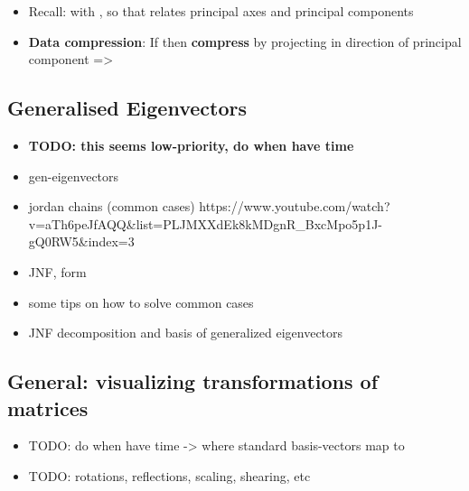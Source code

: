 \begin{itemize}
        \begin{itemize}

          \item
                Recall:
                with , so that
                relates principal axes and principal components
          \item
                \textbf{Data compression}: If 
                then \textbf{compress}  by projecting in direction of
                principal component =\textgreater{}
        \end{itemize}
\end{itemize}

\subsection*{Generalised Eigenvectors}

\begin{itemize}

  \item
        \textbf{TODO: this seems low-priority, do when have time}
  \item
        gen-eigenvectors
  \item
        jordan chains (common cases)
        https://www.youtube.com/watch?v=aTh6peJfAQQ\&list=PLJMXXdEk8kMDgnR\_BxcMpo5p1J-gQ0RW5\&index=3
  \item
        JNF, form
  \item
        some tips on how to solve common cases
  \item
        JNF decomposition and basis of generalized eigenvectors
\end{itemize}

\subsection*{General: visualizing transformations of
  matrices}

\begin{itemize}

  \item
        TODO: do when have time -\textgreater{} where standard basis-vectors
        map to
  \item
        TODO: rotations, reflections, scaling, shearing, etc
\end{itemize}